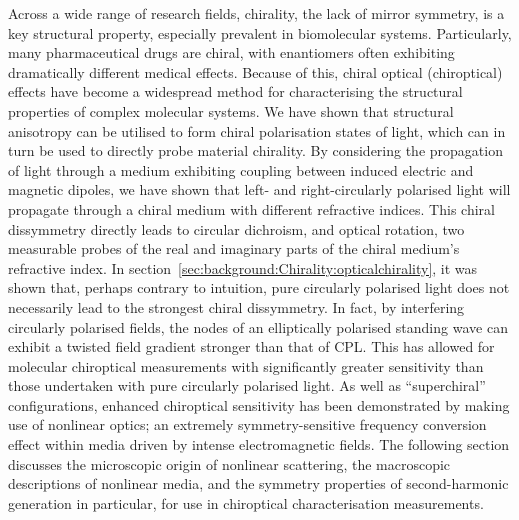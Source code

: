 Across a wide range of research fields, chirality, the lack of mirror symmetry, is a key structural property, especially prevalent in biomolecular systems. Particularly, many pharmaceutical drugs are chiral, with enantiomers often exhibiting dramatically different medical effects.
Because of this, chiral optical (chiroptical) effects have become a widespread method for characterising the structural properties of complex molecular systems.
We have shown that structural anisotropy can be utilised to form chiral polarisation states of light, which can in turn be used to directly probe material chirality.
By considering the propagation of light through a medium exhibiting coupling between induced electric and magnetic dipoles, we have shown that left- and right-circularly polarised light will propagate through a chiral medium with different refractive indices. This chiral dissymmetry directly leads to circular dichroism, and optical rotation, two measurable probes of the real and imaginary parts of the chiral medium's refractive index.
In section~\ref{sec:background:Chirality:opticalchirality}, it was shown that, perhaps contrary to intuition, pure circularly polarised light does not necessarily lead to the strongest chiral dissymmetry. In fact, by interfering circularly polarised fields, the nodes of an elliptically polarised standing wave can exhibit a twisted field gradient stronger than that of CPL. This has allowed for molecular chiroptical measurements with significantly greater sensitivity than those undertaken with pure circularly polarised light.
As well as ``superchiral'' configurations, enhanced chiroptical sensitivity has been demonstrated by making use of nonlinear optics; an extremely symmetry-sensitive frequency conversion effect within media driven by intense electromagnetic fields. The following section discusses the microscopic origin of nonlinear scattering, the macroscopic descriptions of nonlinear media, and the symmetry properties of second-harmonic generation in particular, for use in chiroptical characterisation measurements.